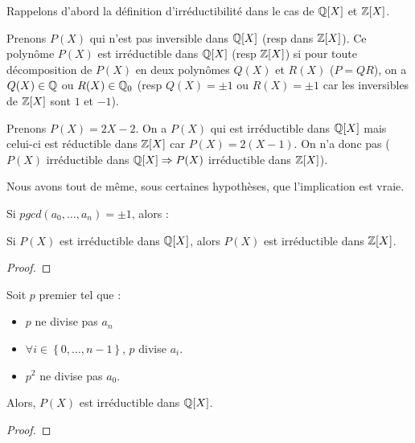 Rappelons d'abord la définition d'irréductibilité dans le cas de $\mathbb{Q}[X]$
et $\mathbb{Z}[X]$.

Prenons $P(X)$ qui n'est pas inversible dans $\mathbb{Q}[X]$ (resp dans
$\mathbb{Z}[X]$).
Ce polynôme $P(X)$ est irréductible dans $\mathbb{Q}[X]$ (resp $\mathbb{Z}[X]$) si
pour toute décomposition de $P(X)$ en deux polynômes $Q(X)$ et $R(X)$ ($P =
QR$), on a $Q(X) \in \mathbb{Q}$ ou $R(X) \in \mathbb{Q}_{0}$ (resp $Q(X) = \pm 1$
ou $R(X) = \pm 1$ car les inversibles de $\mathbb{Z}[X]$ sont $1$ et $-1$).

Prenons $P(X) = 2X-2$. On a $P(X)$ qui est irréductible dans
$\mathbb{Q}[X]$ mais celui-ci est réductible dans $\mathbb{Z}[X]$ car $P(X) =
2(X-1)$. On n'a donc pas ($P(X)$ irréductible dans $\mathbb{Q}[X] \Rightarrow
P(X)$ irréductible dans $\mathbb{Z}[X]$).

Nous avons tout de même, sous certaines hypothèses, que l'implication est vraie.

\begin{proposition}
	Si $pgcd(a_{0}, \ldots, a_{n}) = \pm 1$, alors :

	Si $P(X)$ est irréductible dans $\mathbb{Q}[X]$, alors $P(X)$ est
	irréductible dans $\mathbb{Z}[X]$.
\end{proposition}

\ifdefined\outputproof
\begin{proof}

\end{proof}
\fi

\begin{theorem} 
	Soit $p$ premier tel que :

	\begin{itemize}
		\item $p$ ne divise pas $a_{n}$
		\item $\forall i \in \left\{ 0, \ldots, n - 1 \right\}$, $p$ divise
			$a_{i}$.
		\item $p^{2}$ ne divise pas $a_{0}$.
	\end{itemize}
	\label{critere_E}
	Alors, $P(X)$ est irréductible dans $\mathbb{Q}[X]$.
\end{theorem}

\ifdefined\outputproof
\begin{proof}

\end{proof}
\fi


